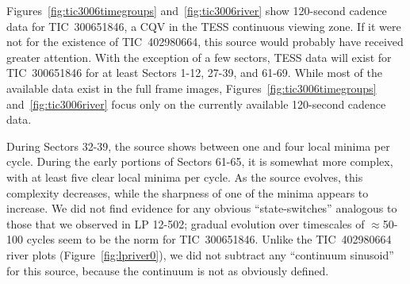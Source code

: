 \documentclass[11pt,twocolumn,tighten]{aastex63}
\begin{document}
Figures~\ref{fig:tic3006timegroups} and~\ref{fig:tic3006river} show
120-second cadence data for TIC~300651846, a CQV in the TESS
continuous viewing zone.  If it were not for the existence of
TIC~402980664, this source would probably have received greater
attention.  With the exception of a few sectors, TESS data will exist
for TIC~300651846 for at least Sectors 1-12, 27-39, and 61-69.  While
most of the available data exist in the full frame images,
Figures~\ref{fig:tic3006timegroups} and~\ref{fig:tic3006river} focus
only on the currently available 120-second cadence data.

During Sectors 32-39, the source shows between one and four local
minima per cycle.  During the early portions of Sectors 61-65, it is
somewhat more complex, with at least five clear local minima per
cycle.  As the source evolves, this complexity decreases, while the
sharpness of one of the minima appears to increase.  We did not find
evidence for any obvious ``state-switches'' analogous to those that we
observed in LP 12-502; gradual evolution over timescales of
$\approx$50-100 cycles seem to be the norm for TIC~300651846.  Unlike
the TIC~402980664 river plots (Figure~\ref{fig:lpriver0}), we did not
subtract any ``continuum sinusoid'' for this source, because the
continuum is not as obviously defined.

\begin{figure*}[!t]
	\begin{center}
	\end{center}
	\vspace{-0.4cm}
	\caption{
		{\bf Light curve evolution of TIC 300651846}.
    All available 120-second cadence data as of 2023 Aug 11 are shown.
    Cycles 0 to 622 span TESS Sectors 32-39 (Nov 2020--June 2021);
    cycles 2296-2676 span Sectors 61-65 (Jan--June 2023).  We assumed
    a 8.254\,hr period and a fixed reference epoch (BTJD 2174.127) for
    both panels.  Light curve segments are split based on the presence
    of gaps longer than three hours.  Cycle numbers are listed in the
    lower-right of each light curve segment.
	}
	\label{fig:tic3006timegroups}
\end{figure*}


\begin{figure*}[!t]
	\begin{center}
	\end{center}
	\vspace{-0.4cm}
	\caption{
		{\bf River plots of TIC 300651846}.
    This is an alternative visualization of the data in
    Figure~\ref{fig:tic3006timegroups}.  All available 120-second
    cadence data as of 2023 Aug 11 are shown.  Cycles 0 to 622 span
    TESS Sectors 32-39 (Nov 2020--June 2021); cycles 2296-2676 span
    Sectors 61-65 (Jan--June 2023).  We assumed $P$$=$8.254\,hr and
    $t_0$=2174.127 [BTJD].  Note that the two panels have slightly
    different color scales.
	}
	\label{fig:tic3006river}
\end{figure*}
\end{document}
